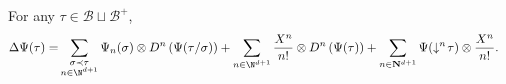 \documentclass[11pt]{preprint}
\newcommand{\mcB}{\mathcal{B}}
\renewcommand{\lg}{\langle}
\newcommand{\rg}{\rangle}
\newcommand{\bfN}{\mathbf{N}}
\begin{document}
	\begin{lemma}\label{lem_DeltaPsitau}
		For any $\tau\in \mcB \sqcup \mcB^+$,
			\begin{align*}
			\Delta \Psi(\tau) = & \sum_{\substack{\sigma\prec\tau\\n\in \N^{d+1}}} \Psi_n(\sigma)\otimes  D^n\left(\Psi(\tau/\sigma)\right)
			+\sum_{n \in \N^{d+1}} \frac{X^n}{n!} \otimes D^n \left( \Psi(\tau)\right) +\sum_{n\in\bfN^{d+1}} \Psi(\downarrow^n\!\tau)\otimes \frac{X^n}{n!}.
		\end{align*}
		
	
\end{lemma}
	
\end{document}
